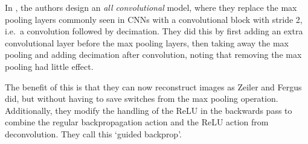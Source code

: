  In \cite{springenberg_striving_2015}, the authors design an \emph{all convolutional} model,
  where they replace the max pooling layers commonly seen in CNNs with a
  convolutional block with stride 2, i.e.\ a convolution followed by decimation.
  They did this by first adding an extra convolutional layer before the max
  pooling layers, then taking away the max pooling and adding decimation after
  convolution, noting that removing the max pooling had little effect.

  The benefit of this is that they can now reconstruct images as Zeiler and
  Fergus did, but without having to save switches from the max pooling
  operation. Additionally, they modify the handling of the ReLU in the
  backwards pass to combine the regular backpropagation action and the ReLU
  action from deconvolution. They call this `guided backprop'.

